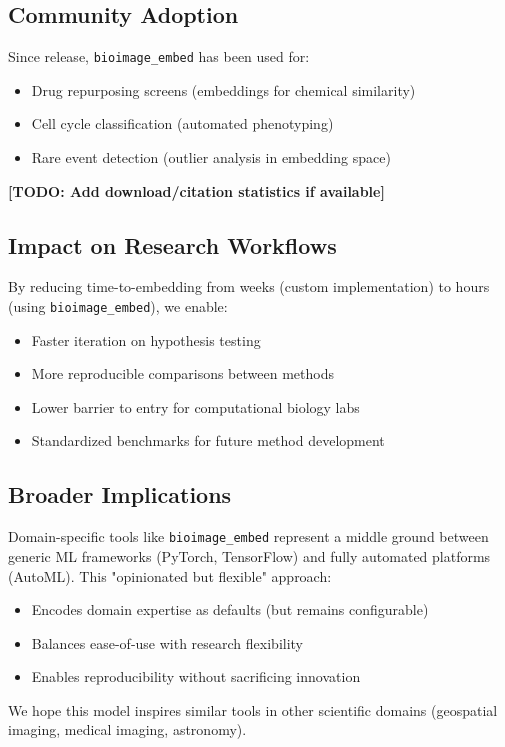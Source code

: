 \subsection{Community Adoption}

Since release, \texttt{bioimage\_embed} has been used for:
\begin{itemize}
    \item Drug repurposing screens (embeddings for chemical similarity)
    \item Cell cycle classification (automated phenotyping)
    \item Rare event detection (outlier analysis in embedding space)
\end{itemize}

\textbf{[TODO: Add download/citation statistics if available]}

\subsection{Impact on Research Workflows}

By reducing time-to-embedding from weeks (custom implementation) to hours (using \texttt{bioimage\_embed}), we enable:
\begin{itemize}
    \item Faster iteration on hypothesis testing
    \item More reproducible comparisons between methods
    \item Lower barrier to entry for computational biology labs
    \item Standardized benchmarks for future method development
\end{itemize}

\subsection{Broader Implications}

Domain-specific tools like \texttt{bioimage\_embed} represent a middle ground between generic ML frameworks (PyTorch, TensorFlow) and fully automated platforms (AutoML). This "opinionated but flexible" approach:

\begin{itemize}
    \item Encodes domain expertise as defaults (but remains configurable)
    \item Balances ease-of-use with research flexibility
    \item Enables reproducibility without sacrificing innovation
\end{itemize}

We hope this model inspires similar tools in other scientific domains (geospatial imaging, medical imaging, astronomy).
